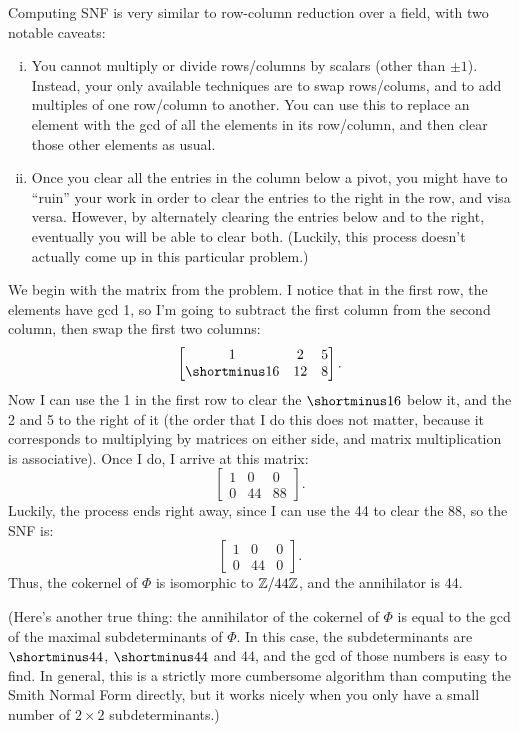 \begin{solution}
\begin{enumerate}
    Computing SNF is very similar to row-column reduction over a field, with two notable caveats:
    \begin{enumerate}[(i)]
        \item You cannot multiply or divide rows/columns by scalars (other than $\pm 1$). Instead, your only available techniques are to swap rows/colums, and to add multiples of one row/column to another. You can use this to replace an element with the gcd of all the elements in its row/column, and then clear those other elements as usual.
        \item Once you clear all the entries in the column below a pivot, you might have to ``ruin'' your work in order to clear the entries to the right in the row, and visa versa. However, by alternately clearing the entries below and to the right, eventually you will be able to clear both. (Luckily, this process doesn't actually come up in this particular problem.)
    \end{enumerate}
    We begin with the matrix from the problem. I notice that in the first row, the elements have gcd 1, so I'm going to subtract the first column from the second column, then swap the first two columns:
    \[\begin{bmatrix} 1 & 2 & 5\\ \shortminus 16 & 12 & 8 \end{bmatrix}.\]
    Now I can use the 1 in the first row to clear the $\shortminus 16$ below it, and the 2 and 5 to the right of it (the order that I do this does not matter, because it corresponds to multiplying by matrices on either side, and matrix multiplication is associative). Once I do, I arrive at this matrix:
    \[\begin{bmatrix} 1 & 0 & 0\\ 0 & 44 & 88 \end{bmatrix}.\]
    Luckily, the process ends right away, since I can use the 44 to clear the 88, so the SNF is:
    \[\begin{bmatrix} 1 & 0 & 0 \\ 0 & 44 & 0 \end{bmatrix}.\]
    Thus, the cokernel of $\Phi$ is isomorphic to $\mathbb{Z}/44\mathbb{Z}$, and the annihilator is 44.

    (Here's another true thing: the annihilator of the cokernel of $\Phi$ is equal to the gcd of the maximal subdeterminants of $\Phi$. In this case, the subdeterminants are $\shortminus 44$, $\shortminus 44$ and $44$, and the gcd of those numbers is easy to find. In general, this is a strictly more cumbersome algorithm than computing the Smith Normal Form directly, but it works nicely when you only have a small number of $2 \times 2$ subdeterminants.)
\end{enumerate}
\end{solution}

